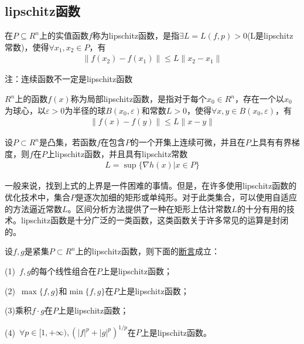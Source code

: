     \subsection{lipschitz函数}
        \begin{definition}[lipschitz函数]
        在$P \subseteq R^n$上的实值函数$f$称为lipschitz函数，是指$\exists L=L(f,p)>0$(L是lipschitz常数)，使得$\forall x_1,x_2 \in P$，有
        \begin{align*}
        \|f(x_2)-f(x_1)\|\leqslant L\|x_2-x_1\|
        \end{align*}
        \end{definition}
        注：连续函数不一定是lipschitz函数
        \begin{definition}[局部lipschitz函数]
        $R^n$上的函数$f(x)$称为局部lipschitz函数，是指对于每个$x_0\in R^n$，存在一个以$x_0$为球心，以$\varepsilon > 0$为半径的球$B(x_0,\varepsilon)$和常数$L>0$，使得$\forall x,y\in B(x_0,\varepsilon)$，有
        \begin{align*}
        \|f(x)-f(y)\|\leqslant L\|x-y\|
        \end{align*}
        \end{definition}
        \begin{proposition}
        设$P\subset R^n$是凸集，若函数$f$在包含$P$的一个开集上连续可微，并且在$P$上具有有界梯度，则$f$在$P$上lipschitz函数，并且具有lipschitz常数
        \begin{align*}
        L={\sup}\{\nabla h(x)|x\in P\}
        \end{align*}
        \end{proposition}
        \par
        一般来说，找到上式的上界是一件困难的事情。但是，在许多使用lipschitz函数的优化技术中，集合$P$是逐次加细的矩形或单纯形。对于此类集合，可以使用自适应的方法逼近常数$L$。区间分析方法提供了一种在矩形上估计常数$L$的十分有用的技术。lipschitz函数是十分广泛的一类函数，这类函数关于许多常见的运算是封闭的。
        \begin{proposition}
        设$f,g$是紧集$P\subset R^n$上的lipschitz函数，则下面的\underline{断言}成立：
        \par
        (1)\ $f,g$的每个线性组合在$P$上是lipschitz函数；
        \par
        (2)\ ${\max}\{f,g\}$和${\min}\{f,g\}$在$P$上是lipschitz函数；
        \par
        (3)乘积$f\cdot g$在$P$上是lipschitz函数；
        \par
        (4)\ $\forall p\in[1,+\infty),(|f|^p+|g|^p)^{1/p}$在$P$上是lipschitz函数。
        \end{proposition}
